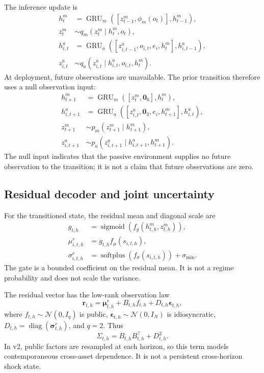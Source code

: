 \documentclass[11pt]{article}
\begin{document}
The inference update is
\begin{align}
 h_t^m&=\operatorname{GRU}_m([z_{t-1}^m,\phi_m(o_t)],h_{t-1}^m),\\
 z_t^m&\sim q_m(z_t^m\mid h_t^m,o_t),\\
 h_{i,t}^a&=\operatorname{GRU}_a([z_{i,t-1}^a,o_{i,t},e_i,h_t^m],h_{i,t-1}^a),\\
 z_{i,t}^a&\sim q_a(z_{i,t}^a\mid h_{i,t}^a,o_{i,t},h_t^m).
\end{align}
At deployment, future observations are unavailable. The prior transition therefore uses a null observation input:
\begin{align}
 h_{t+1}^m&=\operatorname{GRU}_m([z_t^m,\mathbf0_6],h_t^m),\\
 h_{i,t+1}^a&=\operatorname{GRU}_a([z_{i,t}^a,\mathbf0_3,e_i,h_{t+1}^m],h_{i,t}^a),\\
 z_{t+1}^m&\sim p_m(z_{t+1}^m\mid h_{t+1}^m),\\
 z_{i,t+1}^a&\sim p_a(z_{i,t+1}^a\mid h_{i,t+1}^a,h_{t+1}^m).
\end{align}
The null input indicates that the passive environment supplies no future observation to the transition; it is not a claim that future observations are zero.

\subsection{Residual decoder and joint uncertainty}
For the transitioned state, the residual mean and diagonal scale are
\begin{align}
 g_{t,h}&=\operatorname{sigmoid}(f_g(h_{t,h}^m,z_{t,h}^m)),\\
 \mu^r_{i,t,h}&=g_{t,h}f_\mu(s_{i,t,h}),\\
 \sigma^r_{i,t,h}&=\operatorname{softplus}(f_\sigma(s_{i,t,h}))+\sigma_{\min}.
\end{align}
The gate is a bounded coefficient on the residual mean. It is not a regime probability and does not scale the variance.

The residual vector has the low-rank observation law
\begin{equation}
 \mathbf r_{t,h}=\boldsymbol\mu^r_{t,h}+B_{t,h}f_{t,h}+D_{t,h}\boldsymbol\epsilon_{t,h},
\end{equation}
where $f_{t,h}\sim\mathcal N(0,I_q)$ is public, $\boldsymbol\epsilon_{t,h}\sim\mathcal N(0,I_N)$ is idiosyncratic, $D_{t,h}=\operatorname{diag}(\boldsymbol\sigma^r_{t,h})$, and $q=2$. Thus
\begin{equation}
 \Sigma_{t,h}=B_{t,h}B_{t,h}^{\top}+D_{t,h}^2.
\end{equation}
In v2, public factors are resampled at each horizon, so this term models contemporaneous cross-asset dependence. It is not a persistent cross-horizon shock state.
\end{document}
